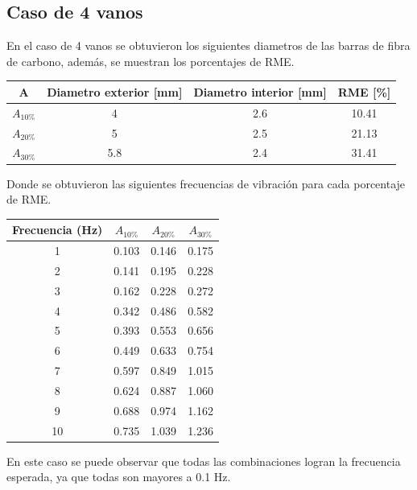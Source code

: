 \subsection{Caso de 4 vanos}
En el caso de 4 vanos se obtuvieron los siguientes diametros de las barras de fibra de carbono, además, se muestran los porcentajes de RME.

\begin{table}[H]
    \centering
    \begin{tabular}{cccc}
    \toprule
     A & Diametro exterior [mm] & Diametro interior [mm] & RME [\%] \\
    \midrule
     $A_{10\%}$ &  4 &  2.6 &  10.41 \\
     $A_{20\%}$ &  5 &  2.5 &  21.13 \\
     $A_{30\%}$ &  5.8 &  2.4 &  31.41 \\
    \bottomrule
    \end{tabular}
\end{table}

Donde se obtuvieron las siguientes frecuencias de vibración para cada porcentaje de RME.

\begin{table}[H]
    \centering
    \begin{tabular}{cccc}
    \toprule
     Frecuencia (Hz) & $A_{10\%}$ & $A_{20\%}$ & $A_{30\%}$ \\
    \midrule
     1 &       0.103 &       0.146 &       0.175 \\
     2 &       0.141 &       0.195 &       0.228 \\
     3 &       0.162 &       0.228 &       0.272 \\
     4 &       0.342 &       0.486 &       0.582 \\
     5 &       0.393 &       0.553 &       0.656 \\
     6 &       0.449 &       0.633 &       0.754 \\
     7 &       0.597 &       0.849 &       1.015 \\
     8 &       0.624 &       0.887 &       1.060 \\
     9 &       0.688 &       0.974 &       1.162 \\
     10 &       0.735 &       1.039 &       1.236 \\
    \bottomrule
    \end{tabular}
\end{table}

En este caso se puede observar que todas las combinaciones logran la frecuencia esperada, ya que todas son mayores a 0.1 Hz.

